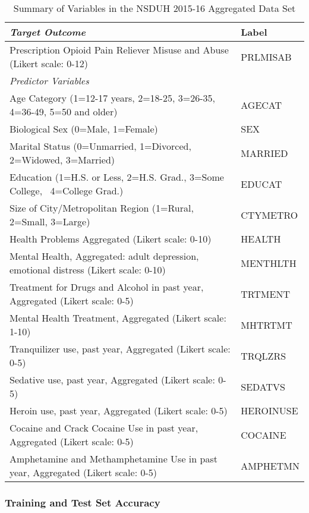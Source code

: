 \documentclass[sigconf]{acmart}
\begin{document}
\begin{table*}[ht]
  \caption{Summary of Variables in the NSDUH 2015-16 Aggregated Data Set}
  \label{tab:freq}
  \begin{tabular}{ll}
    \toprule
    \textit{Target Outcome} & Label \\
    \midrule
    Prescription Opioid Pain Reliever Misuse and Abuse 
    (Likert scale: 0-12)& PRLMISAB  \\
    \midrule
    \textit{Predictor Variables}&   \\
    \midrule
    Age Category (1=12-17 years, 2=18-25, 3=26-35, 4=36-49, 5=50 and older)& AGECAT \\
    Biological Sex (0=Male, 1=Female)& SEX  \\
    Marital Status (0=Unmarried, 1=Divorced, 2=Widowed, 3=Married)& MARRIED  \\
    Education (1=H.S. or Less, 2=H.S. Grad., 3=Some College,  4=College Grad.)& EDUCAT  \\
    Size of City/Metropolitan Region (1=Rural, 2=Small, 3=Large)& CTYMETRO  \\
    Health Problems Aggregated  (Likert scale: 0-10)& HEALTH  \\
    Mental Health, Aggregated: adult depression, emotional distress 
    (Likert scale: 0-10)& MENTHLTH  \\
    Treatment for Drugs and Alcohol in past year, Aggregated 
    (Likert scale: 0-5)& TRTMENT  \\
    Mental Health Treatment, Aggregated (Likert scale: 1-10)& MHTRTMT  \\
    Tranquilizer use, past year, Aggregated (Likert scale: 0-5)& TRQLZRS \\
    Sedative use, past year, Aggregated (Likert scale: 0-5)& SEDATVS  \\
    Heroin use, past year, Aggregated (Likert scale: 0-5)& HEROINUSE  \\
    Cocaine and Crack Cocaine Use in past year, Aggregated  
    (Likert scale: 0-5)& COCAINE  \\
    Amphetamine and Methamphetamine Use in past year, Aggregated 
    (Likert scale: 0-5)& AMPHETMN  \\
    \bottomrule
  \end{tabular}
\end{table*}


\subsubsection{Training and Test Set Accuracy}
\end{document}
